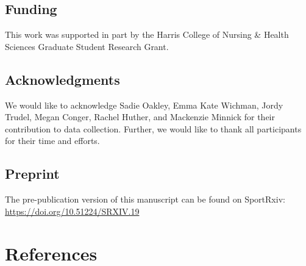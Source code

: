 \documentclass[]{cik}%
\begin{document}
\hypertarget{funding}{%
\subsection{Funding}\label{funding}}

This work was supported in part by the Harris College of Nursing \&
Health Sciences Graduate Student Research Grant.

\hypertarget{acknowledgments}{%
\subsection{Acknowledgments}\label{acknowledgments}}

We would like to acknowledge Sadie Oakley, Emma Kate Wichman, Jordy
Trudel, Megan Conger, Rachel Huther, and Mackenzie Minnick for their
contribution to data collection. Further, we would like to thank all
participants for their time and efforts.

\hypertarget{preprint}{%
\subsection{Preprint}\label{preprint}}

The pre-publication version of this manuscript can be found on
SportRxiv: \url{https://doi.org/10.51224/SRXIV.19}

\newpage

\hypertarget{references}{%
\section{References}\label{references}}

\parindent0pt 
\setlength{\parskip}{1em}
\end{document}
